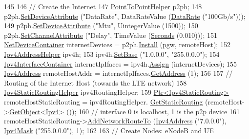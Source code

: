 \begin{DoxyCode}
145 
146   \textcolor{comment}{// Create the Internet}
147   \hyperlink{classns3_1_1PointToPointHelper}{PointToPointHelper} p2ph;
148   p2ph.\hyperlink{classns3_1_1PointToPointHelper_a4577f5ab8c387e5528af2e0fbab1152e}{SetDeviceAttribute} (\textcolor{stringliteral}{"DataRate"}, DataRateValue (\hyperlink{classns3_1_1DataRate}{DataRate} (\textcolor{stringliteral}{"100Gb/s"})));
149   p2ph.\hyperlink{classns3_1_1PointToPointHelper_a4577f5ab8c387e5528af2e0fbab1152e}{SetDeviceAttribute} (\textcolor{stringliteral}{"Mtu"}, UintegerValue (1500));
150   p2ph.\hyperlink{classns3_1_1PointToPointHelper_a6b5317fd17fb61e5a53f8d66a90b63b9}{SetChannelAttribute} (\textcolor{stringliteral}{"Delay"}, TimeValue (\hyperlink{group__timecivil_ga33c34b816f8ff6628e33d5c8e9713b9e}{Seconds} (0.010)));
151   \hyperlink{classns3_1_1NetDeviceContainer}{NetDeviceContainer} internetDevices = p2ph.\hyperlink{classns3_1_1PointToPointHelper_ab9162fea3e88722666fed1106df1f9ec}{Install} (pgw, remoteHost);
152   \hyperlink{classns3_1_1Ipv4AddressHelper}{Ipv4AddressHelper} ipv4h;
153   ipv4h.\hyperlink{classns3_1_1Ipv4AddressHelper_acf7b16dd25bac67e00f5e25f90a9a035}{SetBase} (\textcolor{stringliteral}{"1.0.0.0"}, \textcolor{stringliteral}{"255.0.0.0"});
154   \hyperlink{classns3_1_1Ipv4InterfaceContainer}{Ipv4InterfaceContainer} internetIpIfaces = ipv4h.\hyperlink{classns3_1_1Ipv4AddressHelper_af8e7f4a1a7e74c00014a1eac445a27af}{Assign} (internetDevices);
155   \hyperlink{classns3_1_1Ipv4Address}{Ipv4Address} remoteHostAddr = internetIpIfaces.\hyperlink{classns3_1_1Ipv4InterfaceContainer_ae63208dcd222be986822937ee4aa828c}{GetAddress} (1);
156 
157   \textcolor{comment}{// Routing of the Internet Host (towards the LTE network)}
158   \hyperlink{classns3_1_1Ipv4StaticRoutingHelper}{Ipv4StaticRoutingHelper} ipv4RoutingHelper;
159   \hyperlink{classns3_1_1Ptr}{Ptr<Ipv4StaticRouting>} remoteHostStaticRouting = ipv4RoutingHelper.
      \hyperlink{classns3_1_1Ipv4StaticRoutingHelper_a731206e50d305695dac7fb2ef963a4bb}{GetStaticRouting} (remoteHost->\hyperlink{classns3_1_1Object_a13e18c00017096c8381eb651d5bd0783}{GetObject}<\hyperlink{classns3_1_1Ipv4}{Ipv4}> ());
160   \textcolor{comment}{// interface 0 is localhost, 1 is the p2p device}
161   remoteHostStaticRouting->\hyperlink{classns3_1_1Ipv4StaticRouting_a8bf5eaa7ba49fe33c78c70d5560b6c39}{AddNetworkRouteTo} (\hyperlink{classns3_1_1Ipv4Address}{Ipv4Address} (\textcolor{stringliteral}{"7.0.0.0"}), 
      \hyperlink{classns3_1_1Ipv4Mask}{Ipv4Mask} (\textcolor{stringliteral}{"255.0.0.0"}), 1);
162 
163   \textcolor{comment}{// Create Nodes: eNodeB and UE}

\end{DoxyCode}
